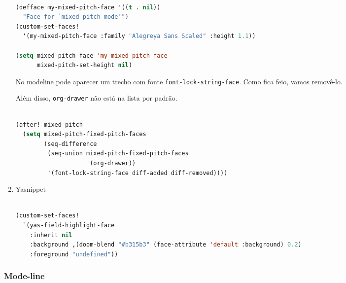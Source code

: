 \documentclass[11pt]{article}
\begin{document}
\begin{enumerate}
  \begin{lstlisting}[language=Lisp]%! Someone please complete this list for me

(defface my-mixed-pitch-face '((t . nil))
  "Face for `mixed-pitch-mode'")
(custom-set-faces!
  '(my-mixed-pitch-face :family "Alegreya Sans Scaled" :height 1.1))

(setq mixed-pitch-face 'my-mixed-pitch-face
      mixed-pitch-set-height nil)
\end{lstlisting}

No modeline pode aparecer um trecho com fonte \lstinline|font-lock-string-face|. Como fica feio, vamos removê-lo.

Além disso, \lstinline|org-drawer| não está na lista por padrão.

\begin{lstlisting}[language=Lisp]%! Someone please complete this list for me

(after! mixed-pitch
  (setq mixed-pitch-fixed-pitch-faces
        (seq-difference
         (seq-union mixed-pitch-fixed-pitch-faces
                    '(org-drawer))
         '(font-lock-string-face diff-added diff-removed))))
\end{lstlisting}
  \item Yasnippet
  \label{sec:yasnippet-1}

  \begin{lstlisting}[language=Lisp]%! Someone please complete this list for me

(custom-set-faces!
  `(yas-field-highlight-face
    :inherit nil
    :background ,(doom-blend "#b315b3" (face-attribute 'default :background) 0.2)
    :foreground "undefined"))
\end{lstlisting}
\end{enumerate}

\subsubsection{Mode-line}
\label{sec:mode-line}
\end{document}
